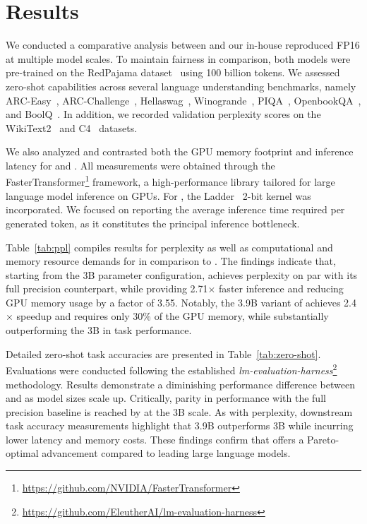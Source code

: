 \section{Results}

We conducted a comparative analysis between  and our in-house reproduced FP16  at multiple model scales. To maintain fairness in comparison, both models were pre-trained on the RedPajama dataset~\cite{redpajama} using 100 billion tokens. We assessed zero-shot capabilities across several language understanding benchmarks, namely ARC-Easy~\cite{arc}, ARC-Challenge~\cite{arc}, Hellaswag~\cite{hellaswag}, Winogrande~\cite{winoGrande}, PIQA~\cite{piqa}, OpenbookQA~\cite{openbookqa}, and BoolQ~\cite{boolq}. In addition, we recorded validation perplexity scores on the WikiText2~\cite{wikitext2} and C4~\cite{c4} datasets.

We also analyzed and contrasted both the GPU memory footprint and inference latency for  and . All measurements were obtained through the FasterTransformer\footnote{\url{https://github.com/NVIDIA/FasterTransformer}} framework, a high-performance library tailored for large language model inference on GPUs. For , the Ladder~\cite{ladder} 2-bit kernel was incorporated. We focused on reporting the average inference time required per generated token, as it constitutes the principal inference bottleneck.

Table~\ref{tab:ppl} compiles results for perplexity as well as computational and memory resource demands for  in comparison to . The findings indicate that, starting from the 3B parameter configuration,  achieves perplexity on par with its full precision  counterpart, while providing 2.71$\times$ faster inference and reducing GPU memory usage by a factor of 3.55. Notably, the 3.9B variant of  achieves 2.4$\times$ speedup and requires only 30\% of the GPU memory, while substantially outperforming the  3B in task performance.

Detailed zero-shot task accuracies are presented in Table~\ref{tab:zero-shot}. Evaluations were conducted following the established \emph{lm-evaluation-harness}\footnote{\url{https://github.com/EleutherAI/lm-evaluation-harness}} methodology. Results demonstrate a diminishing performance difference between  and  as model sizes scale up. Critically, parity in performance with the full precision baseline is reached by  at the 3B scale. As with perplexity, downstream task accuracy measurements highlight that  3.9B outperforms  3B while incurring lower latency and memory costs. These findings confirm that  offers a Pareto-optimal advancement compared to leading large language models.

